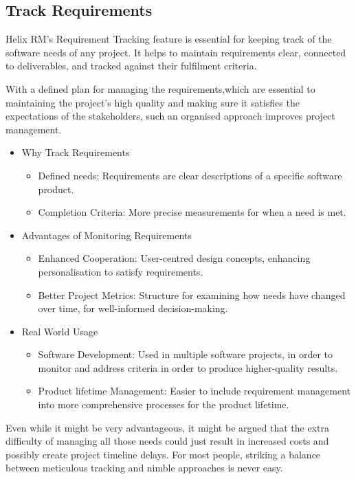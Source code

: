 \subsection{Track Requirements}

Helix RM's Requirement Tracking feature is essential for keeping
track of the software needs of any project.
It helps to maintain requirements clear, connected to
deliverables, and tracked against their fulfilment criteria.

With a defined plan for managing the requirements,which
are essential to maintaining the project's high quality and
making sure it satisfies the expectations of the stakeholders,
such an organised approach improves project management.

\begin{itemize}
    \item Why Track Requirements
    \begin{itemize}
        \item Defined needs: Requirements are clear descriptions of a specific software product\cite{b1}.
        \item Completion Criteria: More precise measurements for when a need is met\cite{b2}.
    \end{itemize}

    \item Advantages of Monitoring Requirements
    \begin{itemize}
        \item Enhanced Cooperation: User-centred design concepts, enhancing personalisation to satisfy requirements\cite{b3}.
        \item Better Project Metrics: Structure for examining how needs have changed over time, for well-informed decision-making\cite{b2}.
    \end{itemize}

    \item Real World Usage
    \begin{itemize}
        \item Software Development: Used in multiple software projects, in order to monitor and address criteria in order to produce higher-quality results\cite{b4}.
        \item Product lifetime Management: Easier to include requirement management into more comprehensive processes for the product lifetime\cite{b3}.
    \end{itemize}
\end{itemize}

Even while it might be very advantageous, it might be
argued that the extra difficulty of managing all those needs
could just result in increased costs and possibly create project
timeline delays.
For most people, striking a balance between meticulous
tracking and nimble approaches is never easy.

